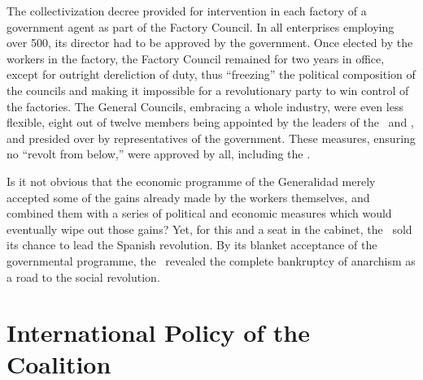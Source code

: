 The collectivization decree provided for intervention in each factory of a government agent as part of the Factory Council. In all enterprises employing over 500, its director had to be approved by the government. Once elected by the workers in the factory, the Factory Council remained for two years in office, except for outright dereliction of duty, thus ``freezing'' the political composition of the councils and making it impossible for a revolutionary party to win control of the factories. The General Councils, embracing a whole industry, were even less flexible, eight out of twelve members being appointed by the leaders of the \UGT\ and \CNT, and presided over by representatives of the government. These measures, ensuring no ``revolt from below,'' were approved by all, including the \POUM.

Is it not obvious that the economic programme of the Generalidad merely accepted some of the gains already made by the workers themselves, and combined them with a series of political and economic measures which would eventually wipe out those gains? Yet, for this and a seat in the cabinet, the \POUM\ sold its chance to lead the Spanish revolution. By its blanket acceptance of the governmental programme, the \CNT\ revealed the complete bankruptcy of anarchism as a road to the social revolution.

\section*{International Policy of the Coalition}

